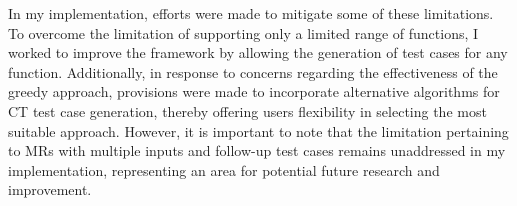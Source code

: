 In my implementation, efforts were made to mitigate some of these limitations.
To overcome the limitation of supporting only a limited range of functions, I worked to improve the framework by allowing the generation of test cases for any function.
Additionally, in response to concerns regarding the effectiveness of the greedy approach, provisions were made to incorporate alternative algorithms for CT test case generation, thereby offering users flexibility in selecting the most suitable approach.
However, it is important to note that the limitation pertaining to MRs with multiple inputs and follow-up test cases remains unaddressed in my implementation, representing an area for potential future research and improvement.
